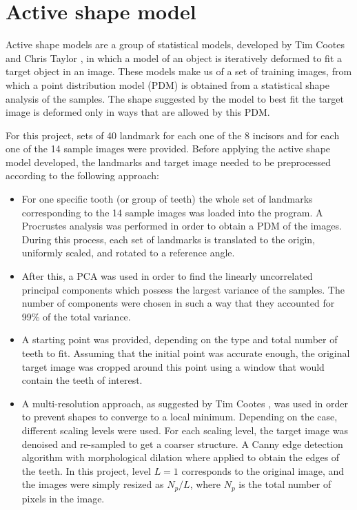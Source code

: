 \documentclass[a4paper,11pt,twoside]{article}
\begin{document}
\section{Active shape model}\label{ASM}

Active shape models are a group of statistical models, developed by Tim Cootes and Chris Taylor \cite{ASM}, in which a model of an object is iteratively deformed to fit a target object in an image. These models make us of a set of training images, from which a point distribution model (PDM) is obtained from a statistical shape analysis of the samples. The shape suggested by the model to best fit the target image is deformed only in ways that are allowed by this PDM. 

For this project,  sets of 40 landmark for each one of the 8 incisors and for each one of the 14 sample images were provided. Before applying the active shape model developed, the landmarks and target image needed to be preprocessed according to the following approach:

\begin{itemize}
\item For one specific tooth (or group of teeth) the whole set of landmarks corresponding to the 14 sample images was loaded into the program. A Procrustes analysis  was performed in order to obtain a PDM of the images. During this process, each set of landmarks is translated to the origin, uniformly scaled, and rotated to a reference angle. 

\item After this, a PCA  was used in order to find the linearly uncorrelated principal components which possess the largest variance of the samples. The number of components were chosen in such a way that they accounted for 99\% of the total variance. 

\item A starting point was provided, depending on the type and total number of teeth to fit. Assuming that the initial point was accurate enough, the original target image was cropped around this point using a window that would contain the teeth of interest.

\item A multi-resolution approach, as suggested by Tim Cootes \cite{ASM2}, was used in order to prevent shapes to converge to a local minimum. Depending on the case, different scaling levels were used. For each scaling level, the target image was denoised and re-sampled to get a coarser structure. A Canny edge detection algorithm with morphological dilation where applied to obtain the edges of the teeth. In this project, level $L=1$ corresponds to the original image, and the images were simply resized as $N_p/L$, where $N_p$ is the total number of pixels in the image.
\end{itemize}
\end{document}
